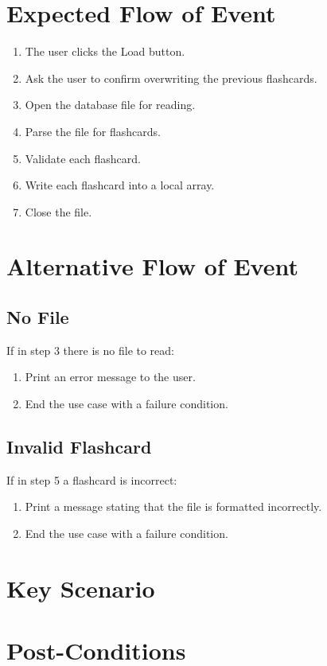 \documentclass{scrreprt}
\begin{document}
\section*{Expected Flow of Event}
\begin{enumerate}[1.]
    \item The user clicks the Load button.
    \item Ask the user to confirm overwriting the previous flashcards.
    \item Open the database file for reading.
    \item Parse the file for flashcards.
    \item Validate each flashcard.
    \item Write each flashcard into a local array.
    \item Close the file.
\end{enumerate}

\section*{Alternative Flow of Event}
\subsection*{No File}
If in step 3 there is no file to read:
\begin{enumerate}
    \item Print an error message to the user.
    \item End the use case with a failure condition.
\end{enumerate}

\subsection*{Invalid Flashcard}
If in step 5 a flashcard is incorrect:
\begin{enumerate}
    \item Print a message stating that the file is formatted incorrectly.
    \item End the use case with a failure condition.
\end{enumerate}

\section*{Key Scenario}
\section*{Post-Conditions}
\end{document}
